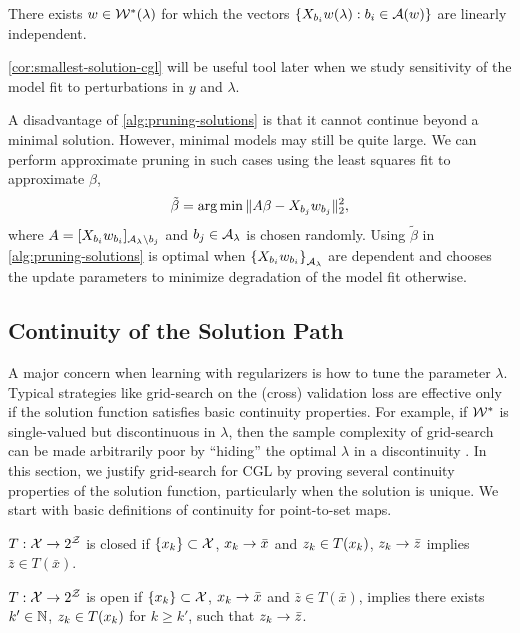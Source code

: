 \begin{corollary}\label{cor:smallest-solution-cgl}
    There exists \( w \in \mathcal{W}^*(\lambda) \) for which the vectors
    \(
    \left\{X_{b_i} w(\lambda) : {b_i} \in \mathcal{A}(w) \right\}
    \)
    are linearly independent.
\end{corollary}

\cref{cor:smallest-solution-cgl} will be useful tool later when we study
sensitivity of the model fit to perturbations in \( y \) and \( \lambda \).

A disadvantage of \cref{alg:pruning-solutions} is that it cannot
continue beyond a minimal solution.
However, minimal models may still be quite large.
We can perform approximate pruning in such cases
using the least squares fit to approximate \( \beta \),
\[ \tilde \beta = \mathop{\rm arg\,min} \|A \beta - X_{b_j} w_{b_j}\|_2^2, \]
where \( A = [X_{b_i} w_{b_i}]_{{\mathcal{A}_{\lambda}} \setminus b_j} \) and \( b_j \in {\mathcal{A}_{\lambda}} \) is
chosen randomly.
Using \( \tilde \beta \) in
\cref{alg:pruning-solutions}
is optimal when \( \left\{X_{b_i} w_{b_i}\right\}_{{\mathcal{A}_{\lambda}}} \) are dependent
and chooses the update parameters to minimize degradation
of the model fit otherwise.

\subsection{Continuity of the Solution Path}

A major concern when learning with regularizers is how to tune the
parameter \( \lambda \).
Typical strategies like grid-search on the (cross) validation
loss are effective only if the solution function satisfies basic continuity
properties.
For example, if \( \mathcal{W}^* \) is single-valued but discontinuous in \( \lambda \),
then the sample complexity of grid-search can be made arbitrarily poor
by ``hiding'' the optimal \( \lambda \) in a
discontinuity \citep[Sec. 1.1]{nesterov2018lectures}.
In this section, we justify grid-search for CGL by proving several
continuity properties of the solution function, particularly when the
solution is unique.
We start with basic definitions of continuity for point-to-set maps.

\begin{definition}[Closed]
    \( T : \mathcal{X} \rightarrow 2^{\mathcal{Z}} \) is closed if
    \( \left\{x_k\right\} \subset \mathcal{X} \), \( x_k \rightarrow \bar x \) and \( z_k \in T(x_k) \),
    \( z_k \rightarrow \bar z \) implies \( \bar z \in T(\bar x) \).
\end{definition}

\begin{definition}[Open]
    \( T : \mathcal{X} \rightarrow 2^{\mathcal{Z}} \) is open if
    \( \left\{x_k\right\} \subset \mathcal{X} \), \( x_k \rightarrow \bar x \) and \( \bar z \in T(\bar x) \),
    implies there exists \( k' \in \mathbb{N} \), \( z_k \in T(x_k) \) for \( k \geq k' \),
    such that \( z_k \rightarrow \bar z \).
\end{definition}

